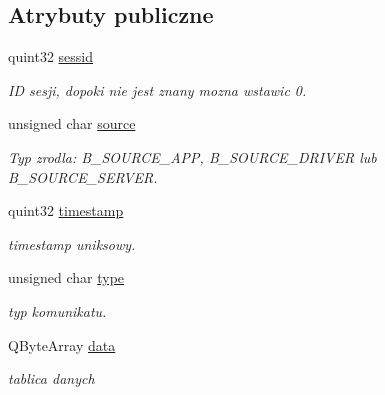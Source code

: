 \subsection*{Atrybuty publiczne}
\begin{DoxyCompactItemize}
\item 
\hypertarget{class_b_datagram_ad77fa0aefd216480abe999e24f28dba6}{
quint32 \hyperlink{class_b_datagram_ad77fa0aefd216480abe999e24f28dba6}{sessid}}
\label{class_b_datagram_ad77fa0aefd216480abe999e24f28dba6}

\begin{DoxyCompactList}\small\item\em ID sesji, dopoki nie jest znany mozna wstawic 0. \item\end{DoxyCompactList}\item 
\hypertarget{class_b_datagram_a2e70a774059cddc0a5715850370bc1d9}{
unsigned char \hyperlink{class_b_datagram_a2e70a774059cddc0a5715850370bc1d9}{source}}
\label{class_b_datagram_a2e70a774059cddc0a5715850370bc1d9}

\begin{DoxyCompactList}\small\item\em Typ zrodla: B\_\-SOURCE\_\-APP, B\_\-SOURCE\_\-DRIVER lub B\_\-SOURCE\_\-SERVER. \item\end{DoxyCompactList}\item 
\hypertarget{class_b_datagram_a1a0d1b7430e0e9d95cd9248b3499904f}{
quint32 \hyperlink{class_b_datagram_a1a0d1b7430e0e9d95cd9248b3499904f}{timestamp}}
\label{class_b_datagram_a1a0d1b7430e0e9d95cd9248b3499904f}

\begin{DoxyCompactList}\small\item\em timestamp uniksowy. \item\end{DoxyCompactList}\item 
\hypertarget{class_b_datagram_a3ae0b66921f9b51864beb65e5e03eeb9}{
unsigned char \hyperlink{class_b_datagram_a3ae0b66921f9b51864beb65e5e03eeb9}{type}}
\label{class_b_datagram_a3ae0b66921f9b51864beb65e5e03eeb9}

\begin{DoxyCompactList}\small\item\em typ komunikatu. \item\end{DoxyCompactList}\item 
\hypertarget{class_b_datagram_a98d72aa468643e0179bbc02d6dbf388e}{
QByteArray \hyperlink{class_b_datagram_a98d72aa468643e0179bbc02d6dbf388e}{data}}
\label{class_b_datagram_a98d72aa468643e0179bbc02d6dbf388e}

\begin{DoxyCompactList}\small\item\em tablica danych \item\end{DoxyCompactList}\end{DoxyCompactItemize}


